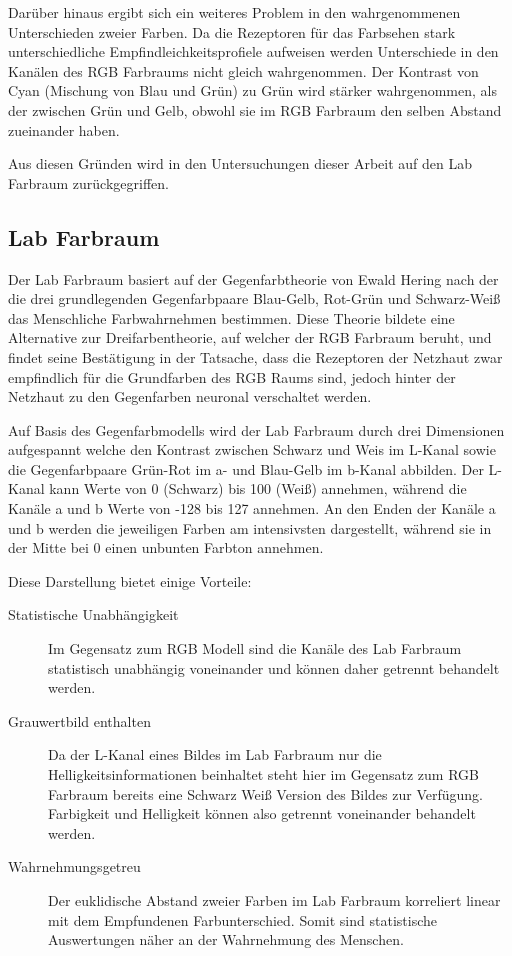 Darüber hinaus ergibt sich ein weiteres Problem in den wahrgenommenen Unterschieden zweier Farben. Da die Rezeptoren für das Farbsehen stark unterschiedliche Empfindleichkeitsprofiele aufweisen werden Unterschiede in den Kanälen des RGB Farbraums nicht gleich wahrgenommen. Der Kontrast von Cyan (Mischung von Blau und Grün) zu Grün wird stärker wahrgenommen, als der zwischen Grün und Gelb, obwohl sie im RGB Farbraum den selben Abstand zueinander haben.

Aus diesen Gründen wird in den Untersuchungen dieser Arbeit auf den Lab Farbraum zurückgegriffen.


\subsection{Lab Farbraum}


Der Lab Farbraum basiert auf der Gegenfarbtheorie von Ewald Hering nach der die drei grundlegenden Gegenfarbpaare Blau-Gelb, Rot-Grün und Schwarz-Weiß das Menschliche Farbwahrnehmen bestimmen. Diese Theorie bildete eine Alternative zur Dreifarbentheorie, auf welcher der RGB Farbraum beruht, und findet seine Bestätigung in der Tatsache, dass die Rezeptoren der Netzhaut zwar empfindlich für die Grundfarben des RGB Raums sind, jedoch hinter der Netzhaut zu den Gegenfarben neuronal verschaltet werden.

Auf Basis des Gegenfarbmodells wird der Lab Farbraum durch drei Dimensionen aufgespannt welche den Kontrast zwischen Schwarz und Weis im L-Kanal sowie die Gegenfarbpaare Grün-Rot im a- und Blau-Gelb im b-Kanal abbilden. Der L-Kanal kann  Werte von 0 (Schwarz) bis 100 (Weiß) annehmen, während die Kanäle a und b Werte von -128 bis 127 annehmen. An den Enden der Kanäle a und b werden die jeweiligen Farben am intensivsten dargestellt, während sie in der Mitte bei 0 einen unbunten Farbton annehmen.

Diese Darstellung bietet einige Vorteile:  

\begin{description}
	\item[Statistische Unabhängigkeit]{
		Im Gegensatz zum RGB Modell sind die Kanäle des Lab Farbraum statistisch unabhängig voneinander und können daher getrennt behandelt werden. 
	}
	\item[Grauwertbild enthalten]{
		Da der L-Kanal eines Bildes im Lab Farbraum nur die Helligkeitsinformationen beinhaltet steht hier im Gegensatz zum RGB Farbraum bereits eine Schwarz Weiß Version des Bildes zur Verfügung. Farbigkeit und Helligkeit können also getrennt voneinander behandelt werden.
	}
	\item[Wahrnehmungsgetreu]{
		Der euklidische Abstand zweier Farben im Lab Farbraum korreliert linear mit dem Empfundenen Farbunterschied. Somit sind statistische Auswertungen näher an der Wahrnehmung des Menschen. 
	}
\end{description}

